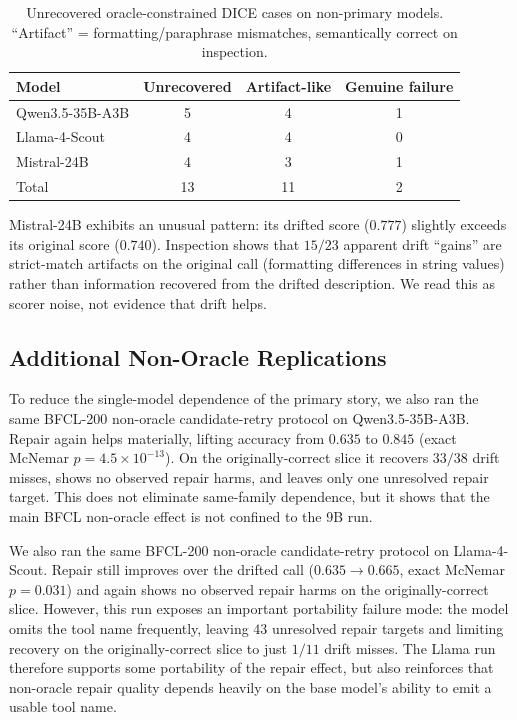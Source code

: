 \documentclass{svproc}
\begin{document}
\begin{table}[t]
\caption{Unrecovered oracle-constrained DICE cases on non-primary models.
``Artifact'' = formatting/paraphrase mismatches, semantically correct on inspection.}
\label{tab:unrecovered-summary}
\centering
\small
\begin{tabular}{lccc}
\toprule
Model & Unrecovered & Artifact-like & Genuine failure \\
\midrule
Qwen3.5-35B-A3B & 5 & 4 & 1 \\
Llama-4-Scout   & 4 & 4 & 0 \\
Mistral-24B     & 4 & 3 & 1 \\
\midrule
Total           & 13 & 11 & 2 \\
\bottomrule
\end{tabular}
\end{table}

Mistral-24B exhibits an unusual pattern: its drifted score ($0.777$) slightly
exceeds its original score ($0.740$). Inspection shows that $15/23$ apparent
drift ``gains'' are strict-match artifacts on the original call (formatting
differences in string values) rather than information recovered from the drifted
description. We read this as scorer noise, not evidence that drift helps.

\subsection{Additional Non-Oracle Replications}
\label{sec:additional-replications}
To reduce the single-model dependence of the primary story, we also ran the same
BFCL-200 non-oracle candidate-retry protocol on Qwen3.5-35B-A3B. Repair again
helps materially, lifting accuracy from $0.635$ to $0.845$ (exact McNemar
$p=4.5\times 10^{-13}$). On the originally-correct slice it recovers $33/38$
drift misses, shows no observed repair harms, and leaves only one unresolved
repair target. This does not eliminate same-family dependence, but it shows that
the main BFCL non-oracle effect is not confined to the 9B run.

We also ran the same BFCL-200 non-oracle candidate-retry protocol on
Llama-4-Scout. Repair still improves over the drifted call ($0.635 \rightarrow
0.665$, exact McNemar $p=0.031$) and again shows no observed repair harms on the
originally-correct slice. However, this run exposes an important portability
failure mode: the model omits the tool name frequently, leaving $43$ unresolved
repair targets and limiting recovery on the originally-correct slice to just
$1/11$ drift misses. The Llama run therefore supports some portability of the
repair effect, but also reinforces that non-oracle repair quality depends heavily
on the base model's ability to emit a usable tool name.
\end{document}
